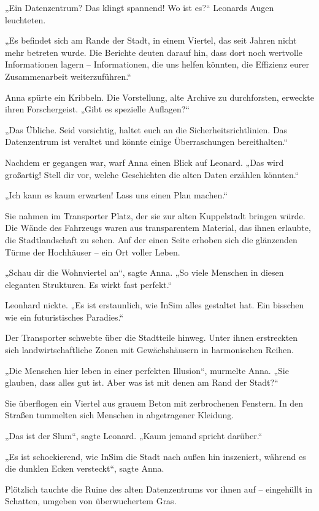 \documentclass[
]{article}
\begin{document}
„Ein Datenzentrum? Das klingt spannend! Wo ist es?{\kern0pt}`` Leonards Augen leuchteten.

„Es befindet sich am Rande der Stadt, in einem Viertel, das seit Jahren nicht mehr betreten wurde. Die Berichte deuten darauf hin, dass dort noch wertvolle Informationen lagern -- Informationen, die uns helfen könnten, die Effizienz eurer Zusammenarbeit weiterzuführen.``

Anna spürte ein Kribbeln. Die Vorstellung, alte Archive zu durchforsten, erweckte ihren Forschergeist. „Gibt es spezielle Auflagen?{\kern0pt}``

„Das Übliche. Seid vorsichtig, haltet euch an die Sicherheitsrichtlinien. Das Datenzentrum ist veraltet und könnte einige Überraschungen bereithalten.``

Nachdem er gegangen war, warf Anna einen Blick auf Leonard. „Das wird großartig! Stell dir vor, welche Geschichten die alten Daten erzählen könnten.``

„Ich kann es kaum erwarten! Lass uns einen Plan machen.``

Sie nahmen im Transporter Platz, der sie zur alten Kuppelstadt bringen würde. Die Wände des Fahrzeugs waren aus transparentem Material, das ihnen erlaubte, die Stadtlandschaft zu sehen. Auf der einen Seite erhoben sich die glänzenden Türme der Hochhäuser -- ein Ort voller Leben.

„Schau dir die Wohnviertel an``, sagte Anna. „So viele Menschen in diesen eleganten Strukturen. Es wirkt fast perfekt.``

Leonhard nickte. „Es ist erstaunlich, wie InSim alles gestaltet hat. Ein bisschen wie ein futuristisches Paradies.``

Der Transporter schwebte über die Stadtteile hinweg. Unter ihnen erstreckten sich landwirtschaftliche Zonen mit Gewächshäusern in harmonischen Reihen.

„Die Menschen hier leben in einer perfekten Illusion``, murmelte Anna. „Sie glauben, dass alles gut ist. Aber was ist mit denen am Rand der Stadt?{\kern0pt}``

Sie überflogen ein Viertel aus grauem Beton mit zerbrochenen Fenstern. In den Straßen tummelten sich Menschen in abgetragener Kleidung.

„Das ist der Slum``, sagte Leonard. „Kaum jemand spricht darüber.``

„Es ist schockierend, wie InSim die Stadt nach außen hin inszeniert, während es die dunklen Ecken versteckt``, sagte Anna.

Plötzlich tauchte die Ruine des alten Datenzentrums vor ihnen auf -- eingehüllt in Schatten, umgeben von überwuchertem Gras.
\end{document}
